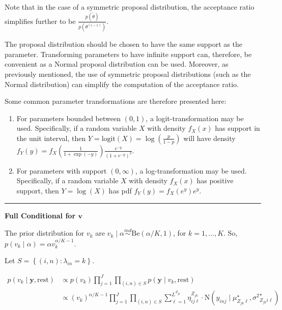 \documentclass[12pt,]{article}
\providecommand{\tightlist}{%
  \setlength{\itemsep}{0pt}\setlength{\parskip}{0pt}}
\newcommand{\p}[1]{\left(#1\right)}
\newcommand{\bc}[1]{ \left\{#1\right\} }
\newcommand{\N}{ \mathcal{N} }
\newcommand{\ind}{\overset{ind}{\sim}}
\def\logit{\text{logit}}
\def\N{\text{N}}
\def\Be{\text{Be}}
\def\lin{\lambda_{in}}
\def\y{\bm{y}}
\def\mus{\mu^\star}
\def\sss{{\sigma^2}^\star}
\def\rest{\text{rest}}
\begin{document}
Note that in the case of a symmetric proposal distribution, the
acceptance ratio simplifies further to be
\(\frac{p(\tilde\theta)}{p(\theta^{(i-1)})}\).

The proposal distribution should be chosen to have the same support as
the parameter. Transforming parameters to have infinite support can,
therefore, be convenient as a Normal proposal distribution can be used.
Moreover, as previously mentioned, the use of symmetric proposal
distributions (such as the Normal distribution) can simplify the
computation of the acceptance ratio.

Some common parameter transformations are therefore presented here:

\begin{enumerate}
\def\labelenumi{\arabic{enumi}.}
\tightlist
\item
  For parameters bounded between \((0,1)\), a logit-transformation may
  be used. Specifically, if a random variable \(X\) with density
  \(f_X(x)\) has support in the unit interval, then
  \(Y=\logit(X)=\log\p{\frac{p}{1-p}}\) will have density
  \(f_Y(y) = f_X\p{\frac{1}{1+\exp(-y)}}\frac{e^{-y}}{(1+e^{-y})^{2}}\).
\item
  For parameters with support \((0,\infty)\), a log-transformation may
  be used. Specifically, if a random variable \(X\) with density
  \(f_X(x)\) has positive support, then \(Y = \log(X)\) has pdf
  \(f_Y(y) = f_X(e^y) e^y\).
\end{enumerate}



\vspace{5em}
\hrule
\vspace{5em}

\textbf{Full Conditional for $\bm v$}

The prior distribution for \(v_k\) are
\(v_k \mid \alpha \ind \Be(\alpha/K, 1)\), for \(k = 1,...,K\). So,
\(p(v_k \mid \alpha) = \alpha v_k^{\alpha/K-1}\).

Let \(S = \bc{(i,n)\colon \lin = k}\).

\begin{align*}
p(v_k \mid \y, \rest) &\propto p(v_k) \prod_{j=1}^J\prod_{(i,n)\in S} p(\y \mid v_k, \rest) \\
&\propto (v_k)^{\alpha/K-1} \prod_{j=1}^J \prod_{(i,n)\in S}
\sum_{\ell=1}^{L^{Z_{jk}}} \eta^{Z_{jk}}_{ij\ell} \cdot
\N(y_{inj} \mid \mus_{Z_{jk}\ell}, \sss_{Z_{jk}i\ell})
\end{align*}

\end{document}
